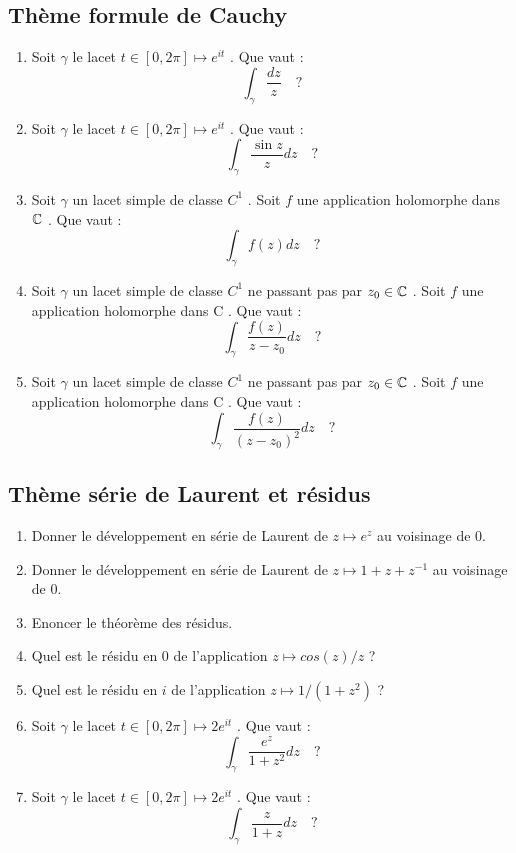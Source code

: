 \documentclass[a4paper, 12pt]{amsart}
\begin{document}
\subsection{Thème formule de Cauchy}
\begin{enumerate}
	\item Soit $\gamma$ le lacet $t \in [0, 2\pi] \mapsto e^{it}$ . Que vaut :
	\[
	\int_\gamma \frac{dz}{z} \quad ?
	\] 
	\item Soit $\gamma$ le lacet $t \in [0, 2\pi] \mapsto e^{it}$ . Que vaut :
	\[
	\int_\gamma \frac{\sin z}{z} dz \quad ?
	\] 
	\item Soit $\gamma$ un lacet simple de classe $C^1$ . Soit $f$ une application holomorphe dans
	$\mathbb{C}$ . Que vaut :
		\[
	\int_\gamma f(z) dz \quad ?
	\] 
	\item Soit  $\gamma$  un lacet simple de classe $C^1$ ne passant pas par $z_0 \in \mathbb{C}$ . Soit $f$ une
	application holomorphe dans C . Que vaut :
	\[
\int_\gamma \frac{f(z)}{z-z_0} dz \quad ?
\] 
		\item Soit  $\gamma$  un lacet simple de classe $C^1$ ne passant pas par $z_0 \in \mathbb{C}$ . Soit $f$ une
	application holomorphe dans C . Que vaut :
	\[
	\int_\gamma \frac{f(z)}{(z-z_0)^2} dz \quad ?
	\] 
\end{enumerate}
\subsection{Thème série de Laurent et résidus}
\begin{enumerate}
	\item Donner le développement en série de Laurent de $z \mapsto e^z$ au voisinage de 0.
	\item Donner le développement en série de Laurent de $z \mapsto 1+z+z^{-1}$ au voisinage de 0.
	\item Enoncer le théorème des résidus.
	\item Quel est le résidu en 0 de l'application $z \mapsto cos(z)/z$ ?
	\item Quel est le résidu en $i$ de l'application $z \mapsto 1/(1 + z^2 )$ ?
	\item Soit $\gamma$ le lacet $t \in [0, 2\pi] \mapsto 2e^{it}$ . Que vaut :
\[
\int_{\gamma} \frac{e^z}{1+z^2}dz\quad ?
\]
	\item Soit $\gamma$ le lacet $t \in [0, 2\pi] \mapsto 2e^{it}$ . Que vaut :
	\[
	\int_{\gamma} \frac{z}{1+z}dz\quad ?
	\]
\end{enumerate}
\end{document}
